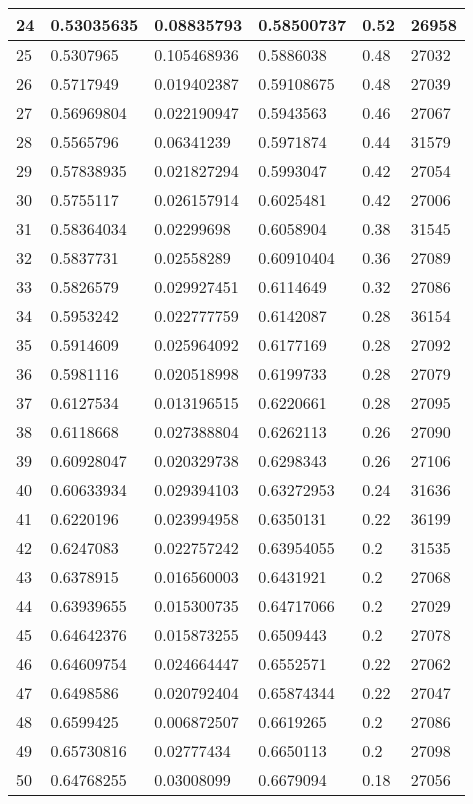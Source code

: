 \begin{longtable}{|l|l|l|l|l|l|}
24 & 0.53035635 & 0.08835793 & 0.58500737 & 0.52 & 26958 \\ \hline 
25 & 0.5307965 & 0.105468936 & 0.5886038 & 0.48 & 27032 \\ \hline 
26 & 0.5717949 & 0.019402387 & 0.59108675 & 0.48 & 27039 \\ \hline 
27 & 0.56969804 & 0.022190947 & 0.5943563 & 0.46 & 27067 \\ \hline 
28 & 0.5565796 & 0.06341239 & 0.5971874 & 0.44 & 31579 \\ \hline 
29 & 0.57838935 & 0.021827294 & 0.5993047 & 0.42 & 27054 \\ \hline 
30 & 0.5755117 & 0.026157914 & 0.6025481 & 0.42 & 27006 \\ \hline 
31 & 0.58364034 & 0.02299698 & 0.6058904 & 0.38 & 31545 \\ \hline 
32 & 0.5837731 & 0.02558289 & 0.60910404 & 0.36 & 27089 \\ \hline 
33 & 0.5826579 & 0.029927451 & 0.6114649 & 0.32 & 27086 \\ \hline 
34 & 0.5953242 & 0.022777759 & 0.6142087 & 0.28 & 36154 \\ \hline 
35 & 0.5914609 & 0.025964092 & 0.6177169 & 0.28 & 27092 \\ \hline 
36 & 0.5981116 & 0.020518998 & 0.6199733 & 0.28 & 27079 \\ \hline 
37 & 0.6127534 & 0.013196515 & 0.6220661 & 0.28 & 27095 \\ \hline 
38 & 0.6118668 & 0.027388804 & 0.6262113 & 0.26 & 27090 \\ \hline 
39 & 0.60928047 & 0.020329738 & 0.6298343 & 0.26 & 27106 \\ \hline 
40 & 0.60633934 & 0.029394103 & 0.63272953 & 0.24 & 31636 \\ \hline 
41 & 0.6220196 & 0.023994958 & 0.6350131 & 0.22 & 36199 \\ \hline 
42 & 0.6247083 & 0.022757242 & 0.63954055 & 0.2 & 31535 \\ \hline 
43 & 0.6378915 & 0.016560003 & 0.6431921 & 0.2 & 27068 \\ \hline 
44 & 0.63939655 & 0.015300735 & 0.64717066 & 0.2 & 27029 \\ \hline 
45 & 0.64642376 & 0.015873255 & 0.6509443 & 0.2 & 27078 \\ \hline 
46 & 0.64609754 & 0.024664447 & 0.6552571 & 0.22 & 27062 \\ \hline 
47 & 0.6498586 & 0.020792404 & 0.65874344 & 0.22 & 27047 \\ \hline 
48 & 0.6599425 & 0.006872507 & 0.6619265 & 0.2 & 27086 \\ \hline 
49 & 0.65730816 & 0.02777434 & 0.6650113 & 0.2 & 27098 \\ \hline 
50 & 0.64768255 & 0.03008099 & 0.6679094 & 0.18 & 27056 \\ \hline 
\end{longtable}